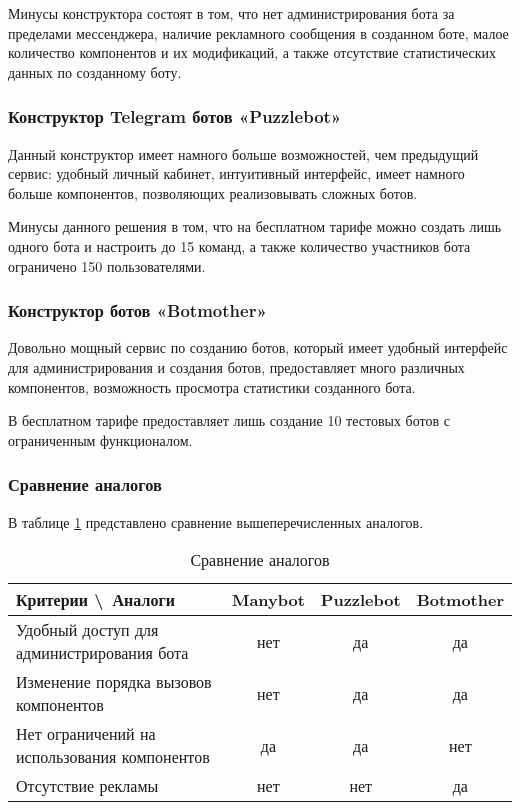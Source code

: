 Минусы конструктора состоят в том, что нет администрирования
бота за пределами мессенджера, наличие рекламного сообщения в
созданном боте, малое количество компонентов и их модификаций,
а также отсутствие статистических данных по созданному боту.

\subsubsection{Конструктор Telegram ботов «Puzzlebot»}


Данный конструктор имеет намного больше возможностей, чем предыдущий сервис:
удобный личный кабинет, интуитивный интерфейс, имеет намного больше компонентов,
позволяющих реализовывать сложных ботов.

Минусы данного решения в том, что на бесплатном тарифе
можно создать лишь одного бота и настроить до 15 команд, а также
количество участников бота ограничено 150 пользователями.

\subsubsection{Конструктор ботов «Botmother»}

Довольно мощный сервис по созданию ботов, который имеет удобный интерфейс
для администрирования и создания ботов, предоставляет много различных компонентов,
возможность просмотра статистики созданного бота.

В бесплатном тарифе предоставляет лишь создание 10 тестовых ботов с ограниченным
функционалом.

\subsubsection{Сравнение аналогов}

В таблице \ref{t:comp-a} представлено сравнение вышеперечисленных аналогов.

\begin{table}[ht]
	\Large
	\caption{Сравнение аналогов}
	\label{t:comp-a}
	\centering
	\begin{tabularx}{\textwidth}{|X|c|c|c|}
		\hline
		Критерии \textbackslash\ Аналоги & Manybot & Puzzlebot & Botmother \\
		\hline
		Удобный доступ для администрирования бота
		                                 & нет     & да        & да        \\
		\hline
		Изменение порядка вызовов компонентов
		                                 & нет     & да        & да        \\
		\hline
		Нет ограничений на использования компонентов
		                                 & да      & да        & нет       \\
		\hline
		Отсутствие рекламы
		                                 & нет     & нет       & да        \\
		\hline
	\end{tabularx}
	\vspace{\bottompaddingoftable}
\end{table}


